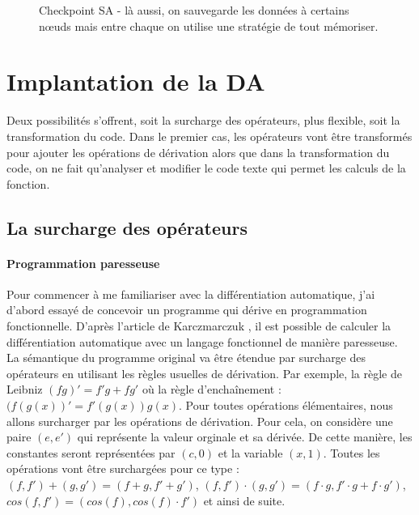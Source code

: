 \begin{figure}
\caption{Checkpoint SA - l\`a aussi, on sauvegarde les donn\'ees \`a certains n\oe uds mais entre
chaque on utilise une strat\'egie de tout m\'emoriser.}





\label{fig:checkpointsa}
\end{figure}
\vspace{1cm}




\section{Implantation de la DA}

Deux possibilit\'es s'offrent, soit la surcharge des op\'erateurs, plus flexible, soit la transformation du code.
Dans le premier cas, les op\'erateurs vont être transform\'es pour ajouter les op\'erations de d\'erivation alors que dans
la transformation du code, on ne fait qu'analyser et modifier le code texte qui permet les calculs de la fonction.

\subsection{La surcharge des op\'erateurs}

\paragraph{Programmation paresseuse}

Pour commencer \`a me familiariser avec la diff\'erentiation automatique, j'ai d'abord essay\'e de 
concevoir un programme qui d\'erive en programmation fonctionnelle. D'apr\`es l'article de Karczmarczuk \cite{paresseuse}, il est possible 
de calculer la diff\'erentiation automatique avec un langage fonctionnel de mani\`ere paresseuse.
La s\'emantique du programme original va être \'etendue par surcharge des op\'erateurs en utilisant
les r\`egles usuelles de d\'erivation. Par exemple, la r\`egle de Leibniz $(fg)'=f'g+fg'$ o\`u la r\`egle
d'encha\^inement : $(f(g(x))'=f'(g(x))g(x)$. Pour toutes op\'erations \'el\'ementaires, nous allons surcharger
par les op\'erations de d\'erivation. Pour cela, on consid\`ere une paire $(e,e')$ qui repr\'esente la valeur
orginale et sa d\'eriv\'ee. De cette mani\`ere, les constantes seront repr\'esent\'ees par $(c,0)$ et la variable
$(x,1)$. Toutes les op\'erations vont être surcharg\'ees pour ce type : $(f,f')+(g,g')=(f+g,f'+g')$, 
$(f,f')\cdot(g,g')=(f\cdot g,f'\cdot g+f\cdot g')$, $cos(f,f')=(cos(f),cos(f)\cdot f')$ et ainsi de suite.

